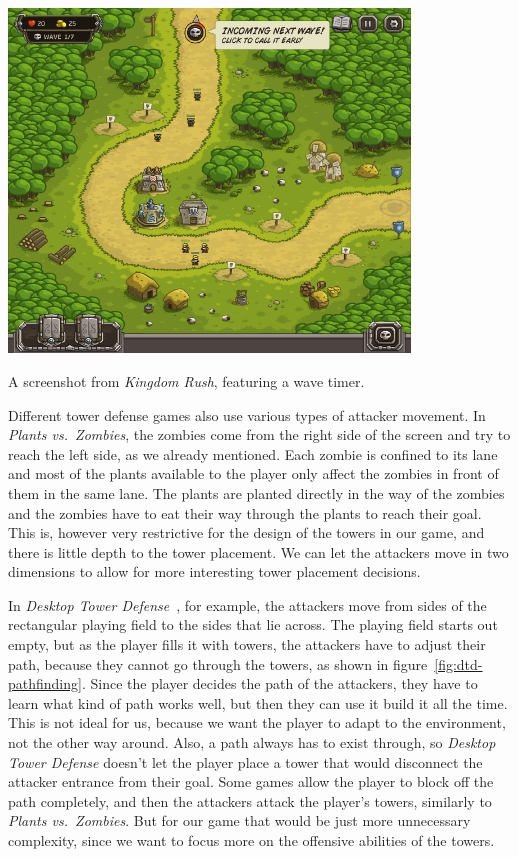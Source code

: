 \begin{center}
    \captionsetup{type=figure}
    \includegraphics[width=0.8\textwidth]{img/Kingdom-Rush-Next-Wave.png}
    \caption{A screenshot from \emph{Kingdom Rush}, featuring a wave timer.}
    \label{fig:kr-next-wave}
\end{center}

Different tower defense games also use various types of attacker movement.
In \emph{Plants vs.\ Zombies}, the zombies come from the right side of the screen and try to reach the left side, as we already mentioned.
Each zombie is confined to its lane and most of the plants available to the player only affect the zombies in front of them in the same lane.
The plants are planted directly in the way of the zombies and the zombies have to eat their way through the plants to reach their goal.
This is, however very restrictive for the design of the towers in our game, and there is little depth to the tower placement.
We can let the attackers move in two dimensions to allow for more interesting tower placement decisions.

In \emph{Desktop Tower Defense}~\cite{DTDWiki}, for example, the attackers move from sides of the rectangular playing field to the sides that lie across.
The playing field starts out empty, but as the player fills it with towers, the attackers have to adjust their path, because they cannot go through the towers, as shown in figure~\ref{fig:dtd-pathfinding}.
Since the player decides the path of the attackers, they have to learn what kind of path works well, but then they can use it build it all the time.
This is not ideal for us, because we want the player to adapt to the environment, not the other way around.
Also, a path always has to exist through, so \emph{Desktop Tower Defense} doesn't let the player place a tower that would disconnect the attacker entrance from their goal.
Some games allow the player to block off the path completely, and then the attackers attack the player's towers, similarly to \emph{Plants vs.\ Zombies}.
But for our game that would be just more unnecessary complexity, since we want to focus more on the offensive abilities of the towers.

